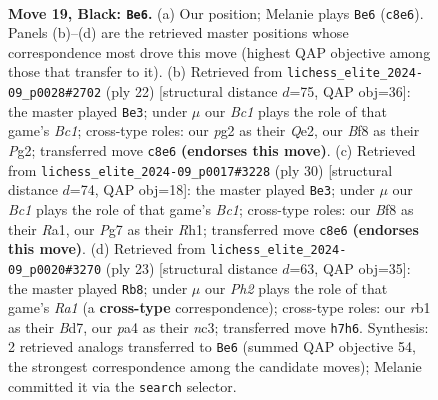 \documentclass[11pt]{article}
\begin{document}
\clearpage

\begin{figure}[p]\centering
\begin{subfigure}{0.46\textwidth}\centering
\resizebox{\linewidth}{!}{%
\newchessgame
\chessboard[
  setfen={r1bk1b1r/pp4pp/2p5/q2p1p2/P2P4/1Q2PN1P/1P3PP1/1RBK3R b - - 2 19},
  showmover=false,
  pgfstyle=straightmove, color=movearrow, markmove={c8-e6}
]}
\caption{}
\end{subfigure}\hfill
\begin{subfigure}{0.46\textwidth}\centering
\resizebox{\linewidth}{!}{%
\newchessgame
\chessboard[
  setfen={r3k1nr/pp3pbp/1q2p1p1/3pP3/3P1P2/2N5/PP2Q1PP/R1B1K2R w KQkq - 0 12},
  showmover=false,
  pgfstyle=straightmove, color=movearrow, markmove={c1-e3}
]}
\caption{}
\end{subfigure}
\\[4pt]
\begin{subfigure}{0.46\textwidth}\centering
\resizebox{\linewidth}{!}{%
\newchessgame
\chessboard[
  setfen={r2k1b1r/p2b3p/1qp1pp2/3p4/5P2/P2B4/1PP1Q1PP/R1B1K2R w KQ - 4 16},
  showmover=false,
  pgfstyle=straightmove, color=movearrow, markmove={c1-e3}
]}
\caption{}
\end{subfigure}\hfill
\begin{subfigure}{0.46\textwidth}\centering
\resizebox{\linewidth}{!}{%
\newchessgame
\chessboard[
  setfen={r3kb1r/1p1b1ppp/p2ppq2/8/4P3/1QN5/PPP2PPP/R1B1R1K1 b kq - 5 12},
  showmover=false,
  pgfstyle=straightmove, color=movearrow, markmove={a8-b8}
]}
\caption{}
\end{subfigure}
\caption{\textbf{Move 19, Black: \texttt{Be6}.} (a) Our position; Melanie plays \texttt{Be6} (\texttt{c8e6}). Panels (b)--(d) are the retrieved master positions whose correspondence most drove this move (highest QAP objective among those that transfer to it). (b) Retrieved from \texttt{lichess\_elite\_2024-09\_p0028\#2702} (ply 22) [structural distance $d$=75, QAP obj=36]: the master played \texttt{Be3}; under $\mu$ our \emph{Bc1} plays the role of that game's \emph{Bc1}; cross-type roles: our \emph{p}g2 as their \emph{Q}e2, our \emph{B}f8 as their \emph{P}g2; transferred move \texttt{c8e6} \textbf{(endorses this move)}. (c) Retrieved from \texttt{lichess\_elite\_2024-09\_p0017\#3228} (ply 30) [structural distance $d$=74, QAP obj=18]: the master played \texttt{Be3}; under $\mu$ our \emph{Bc1} plays the role of that game's \emph{Bc1}; cross-type roles: our \emph{B}f8 as their \emph{R}a1, our \emph{P}g7 as their \emph{R}h1; transferred move \texttt{c8e6} \textbf{(endorses this move)}. (d) Retrieved from \texttt{lichess\_elite\_2024-09\_p0020\#3270} (ply 23) [structural distance $d$=63, QAP obj=35]: the master played \texttt{Rb8}; under $\mu$ our \emph{Ph2} plays the role of that game's \emph{Ra1} (a \textbf{cross-type} correspondence); cross-type roles: our \emph{r}b1 as their \emph{B}d7, our \emph{p}a4 as their \emph{n}c3; transferred move \texttt{h7h6}. Synthesis: 2 retrieved analogs transferred to \texttt{Be6} (summed QAP objective 54, the strongest correspondence among the candidate moves); Melanie committed it via the \texttt{search} selector.}
\label{fig:thought-m37}
\end{figure}
\end{document}
